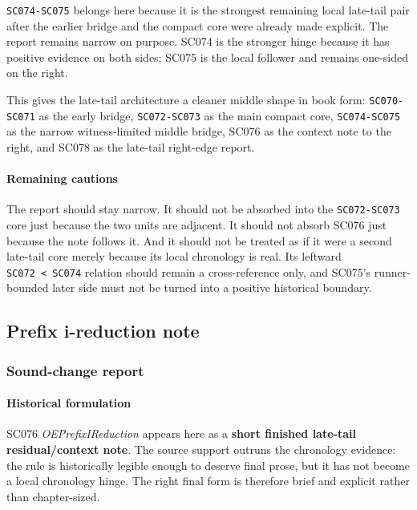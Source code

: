 \documentclass[
  british,
  a4paper,
]{article}
\begin{document}
\texttt{SC074-SC075} belongs here because it is the strongest remaining
local late-tail pair after the earlier bridge and the compact core were
already made explicit. The report remains narrow on purpose. SC074 is
the stronger hinge because it has positive evidence on both sides; SC075
is the local follower and remains one-sided on the right.

This gives the late-tail architecture a cleaner middle shape in book
form: \texttt{SC070-SC071} as the early bridge, \texttt{SC072-SC073} as
the main compact core, \texttt{SC074-SC075} as the narrow
witness-limited middle bridge, SC076 as the context note to the right,
and SC078 as the late-tail right-edge report.

\paragraph{Remaining cautions}\label{remaining-cautions-46}

The report should stay narrow. It should not be absorbed into the
\texttt{SC072-SC073} core just because the two units are adjacent. It
should not absorb SC076 just because the note follows it. And it should
not be treated as if it were a second late-tail core merely because its
local chronology is real. Its leftward
\texttt{SC072\ \textless{}\ SC074} relation should remain a
cross-reference only, and SC075's runner-bounded later side must not be
turned into a positive historical boundary.

\subsection{Prefix i-reduction note}\label{prefix-i-reduction-note}

\subsubsection{Sound-change report}\label{sound-change-report-47}

\paragraph{Historical formulation}\label{historical-formulation-47}

SC076 \emph{OEPrefixIReduction} appears here as a \textbf{short finished
late-tail residual/context note}. The source support outruns the
chronology evidence: the rule is historically legible enough to deserve
final prose, but it has not become a local chronology hinge. The right
final form is therefore brief and explicit rather than chapter-sized.
\end{document}
